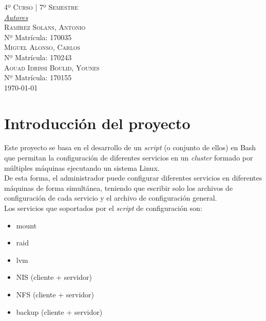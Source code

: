 \documentclass[12pt,a4paper, spanish]{article}
\begin{document}
\begin{titlepage}
  \textsc{\large 4º Curso | 7º Semestre}\\[1cm]

  {\large\underline{\textit{Autores}}}\\[0.2cm]
  \textsc{Ramírez Solans, Antonio}\\
  Nº Matrícula: 170035\\[0.2cm]
  \textsc{Miguel Alonso, Carlos}\\
  Nº Matrícula: 170243\\[0.2cm]
  \textsc{Aouad Idrissi Boulid, Younes}\\
  Nº Matrícula: 170155\\[0.2cm]

  \vfill\vfill\vfill
      {\large\today}


\end{titlepage}


\newpage
\thispagestyle{empty}
\renewcommand*\contentsname{Índice de Contenidos}
\tableofcontents

\newpage
{}
\section{Introducción del proyecto}
Este proyecto se basa en el desarrollo de un \textit{script} (o conjunto de ellos) en Bash que permitan la configuración de diferentes servicios en un \textit{cluster} formado por múltiples máquinas ejecutando un sistema Linux.\\

De esta forma, el administrador puede configurar diferentes servicios en diferentes máquinas de forma simultánea, teniendo que escribir solo los archivos de configuración de cada servicio y el archivo de configuración general.\\

\noindent Los servicios que soportados por el \textit{script} de configuración son:
\begin{itemize}
\item mount
\item raid
\item lvm
\item NIS (cliente + servidor)
\item NFS (cliente + servidor)
\item backup (cliente + servidor)
\end{itemize}
\end{document}
